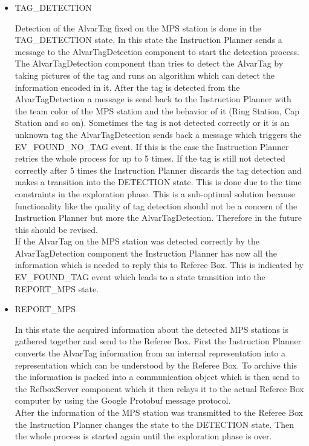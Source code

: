 \begin{itemize}
\item TAG\_DETECTION

Detection of the AlvarTag fixed on the MPS station is done in the TAG\_DETECTION state. In this state the Instruction Planner sends a message to the AlvarTagDetection component to start the detection process. The AlvarTagDetection component than tries to detect the AlvarTag by taking pictures of the tag and runs an algorithm which can detect the information encoded in it. After the tag is detected from the AlvarTagDetection a message is send back to the Instruction Planner with the team color of the MPS station and the behavior of it (Ring Station, Cap Station and so on). Sometimes the tag is not detected correctly or it is an unknown tag the AlvarTagDetection sends back a message which triggers the EV\_FOUND\_NO\_TAG event. If this is the case the Instruction Planner retries the whole process for up to 5 times. If the tag is still not detected correctly after 5 times the Instruction Planner discards the tag detection and makes a transition into the DETECTION state. This is done due to the time constraints in the exploration phase. This is a sub-optimal solution because functionality like the quality of tag detection should not be a concern of the Instruction Planner but more the AlvarTagDetection. Therefore in the future this should be revised. \\

If the AlvarTag on the MPS station was detected correctly by the AlvarTagDetection component the Instruction Planner has now all the information which is needed to reply this to Referee Box. This is indicated by EV\_FOUND\_TAG event which leads to a state transition into the REPORT\_MPS state.


\item REPORT\_MPS

In this state the acquired information about the detected MPS stations is gathered together and send to the Referee Box. First the Instruction Planner converts the AlvarTag information from an internal representation into a representation which can be understood by the Referee Box. To archive this the information is packed into a communication object which is then send to the RefboxServer component which it then relays it to the actual Referee Box computer by using the Google Protobuf message protocol.  \\

After the information of the MPS station was transmitted to the Referee Box the Instruction Planner changes the state to the DETECTION state. Then the whole process is started again until the exploration phase is over. 


\end{itemize}


